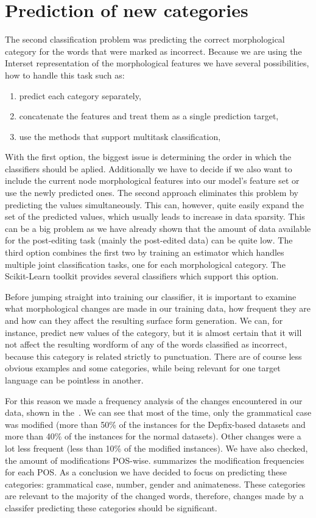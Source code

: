 \section{Prediction of new categories}

The second classification problem was predicting the correct morphological category for
the words that were marked as incorrect. Because we are using the Interset representation
of the morphological features we have several possibilities, how to handle this task such
as:
\begin{enumerate}
    \item predict each category separately,
    \item concatenate the features and treat them as a single prediction target,
    \item use the methods that support multitask classification,
\end{enumerate}

With the first option, the biggest issue is determining the order in which the classifiers
should be aplied. Additionally we have to decide if we also want to include the current node morphological features
into our model's feature set or use the newly predicted ones. The second approach eliminates this problem by predicting the
values simultaneously. This can, however, quite easily expand the set of the predicted values,
which usually leads to increase in data sparsity. This can be a big problem as we have
already shown that the amount of data available for the post-editing task (mainly the post-edited
data) can be quite low. The third option combines the first two by training an estimator
which handles multiple joint classification tasks, one for each morphological category. The
Scikit-Learn toolkit provides several classifiers which support this option.

Before jumping straight into training our classifier, it is important to examine what morphological
changes are made in our training data, how frequent they are and how can they affect the resulting
surface form generation. We can, for instance, predict new values of the  category,
but it is almost certain that it will not affect the resulting wordform of any of the words
classified as incorrect, because this category is related strictly to punctuation. There are
of course less obvious examples and some categories, while being relevant for one target language
can be pointless in another.

For this reason we made a frequency analysis of the changes encountered
in our data, shown in the~. We can see that most of the time, only the grammatical
case was modified (more than 50\% of the instances for the Depfix-based datasets and more than 40\% of the instances for
the normal datasets). Other changes were a lot less frequent (less than 10\% of the modified instances).
We have also checked, the amount of modifications POS-wise.  summarizes the modification frequencies for each
POS. As a conclusion we have decided to focus on predicting these categories: grammatical case, number, gender
and animateness. These categories are relevant to the majority of the changed words, therefore, changes made by
a classifer predicting these categories should be significant.

